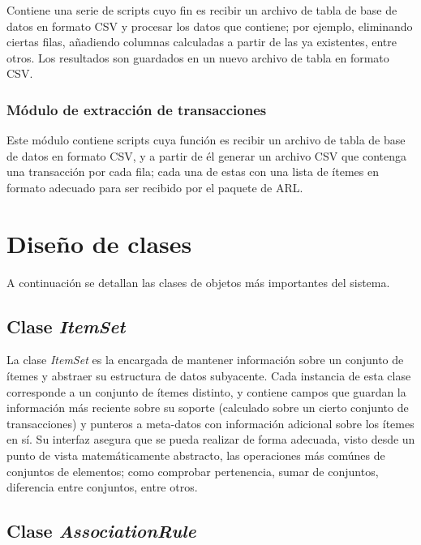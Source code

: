 Contiene una serie de scripts cuyo fin es recibir un archivo de tabla de base de datos en formato CSV y procesar los datos que contiene; por ejemplo, eliminando ciertas filas, añadiendo columnas calculadas a partir de las ya existentes, entre otros. Los resultados son guardados en un nuevo archivo de tabla en formato CSV.

\subsubsection{Módulo de extracción de transacciones}

Este módulo contiene scripts cuya función es recibir un archivo de tabla de base de datos en formato CSV, y a partir de él generar un archivo CSV que contenga una transacción por cada fila; cada una de estas con una lista de ítemes en formato adecuado para ser recibido por el paquete de ARL.

\section{Diseño de clases}

A continuación se detallan las clases de objetos más importantes del sistema.


\subsection{Clase \textit{ItemSet}}

La clase \textit{ItemSet} es la encargada de mantener información sobre un conjunto de ítemes y abstraer su estructura de datos subyacente. Cada instancia de esta clase corresponde a un conjunto de ítemes distinto, y contiene campos que guardan la información más reciente sobre su soporte (calculado sobre un cierto conjunto de transacciones) y punteros a meta-datos con información adicional sobre los ítemes en sí. Su interfaz asegura que se pueda realizar de forma adecuada, visto desde un punto de vista matemáticamente abstracto, las operaciones más comúnes de conjuntos de elementos; como comprobar pertenencia, sumar de conjuntos, diferencia entre conjuntos, entre otros.

\subsection{Clase \textit{AssociationRule}}

